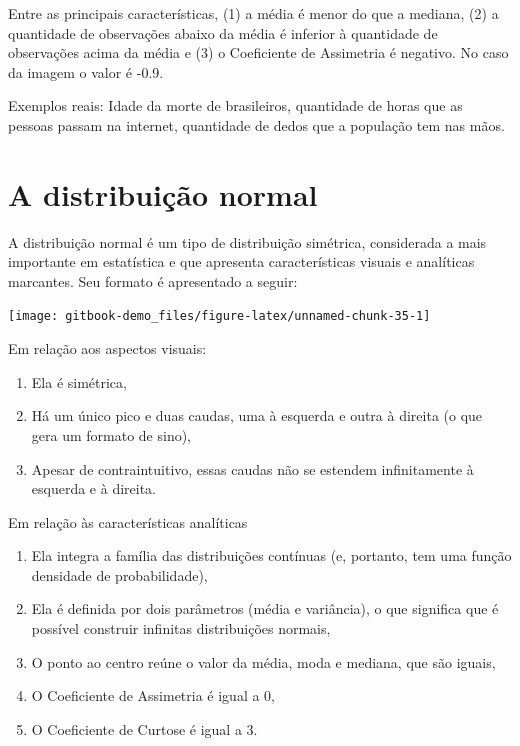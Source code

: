 \documentclass[
]{book}
\providecommand{\tightlist}{%
  \setlength{\itemsep}{0pt}\setlength{\parskip}{0pt}}
\begin{document}
Entre as principais características, (1) a média é menor do que a mediana, (2) a quantidade de observações abaixo da média é inferior à quantidade de observações acima da média e (3) o Coeficiente de Assimetria é negativo. No caso da imagem o valor é -0.9.

Exemplos reais: Idade da morte de brasileiros, quantidade de horas que as pessoas passam na internet, quantidade de dedos que a população tem nas mãos.

\hypertarget{a-distribuiuxe7uxe3o-normal}{%
\section{A distribuição normal}\label{a-distribuiuxe7uxe3o-normal}}

A distribuição normal é um tipo de distribuição simétrica, considerada a mais importante em estatística e que apresenta características visuais e analíticas marcantes. Seu formato é apresentado a seguir:

\begin{center}\texttt{[image: gitbook-demo\_files/figure-latex/unnamed-chunk-35-1]} \end{center}

Em relação aos aspectos visuais:

\begin{enumerate}
\def\labelenumi{\arabic{enumi})}
\tightlist
\item
  Ela é simétrica,\\
\item
  Há um único pico e duas caudas, uma à esquerda e outra à direita (o que gera um formato de sino),\\
\item
  Apesar de contraintuitivo, essas caudas não se estendem infinitamente à esquerda e à direita.
\end{enumerate}

Em relação às características analíticas

\begin{enumerate}
\def\labelenumi{\arabic{enumi})}
\tightlist
\item
  Ela integra a família das distribuições contínuas (e, portanto, tem uma função densidade de probabilidade),
\item
  Ela é definida por dois parâmetros (média e variância), o que significa que é possível construir infinitas distribuições normais,\\
\item
  O ponto ao centro reúne o valor da média, moda e mediana, que são iguais,\\
\item
  O Coeficiente de Assimetria é igual a 0,\\
\item
  O Coeficiente de Curtose é igual a 3.
\end{enumerate}
\end{document}
